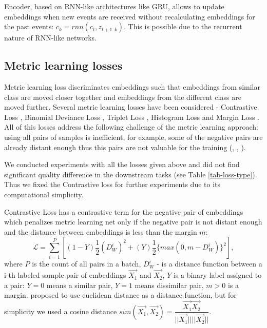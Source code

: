 \documentclass[sigconf]{acmart}
\begin{document}
Encoder, based on RNN-like architectures like GRU\cite{cho2014learning}, allows to update embeddings when new events are received without recalculating embeddings for the past events: $c_k = rnn(c_t, z_{t+1:k})$. This is possible due to the recurrent nature of RNN-like networks.

\subsection{Metric learning losses} \label{sec-ml-loss}

Metric learning loss discriminates embeddings such that embeddings from similar class are moved closer together and embeddings from the different class are moved further. Several metric learning losses have been considered - Contrastive Loss \cite{Hadsell:2006:DRL:1153171.1153654}, Binomial Deviance Loss \cite{Yi:2014:LUE:1407.4979}, Triplet Loss \cite{Hoffer:2015:LUE:1412.6622}, Histogram Loss \cite{histogram-loss} and Margin Loss \cite{wu2017sampling}. All of this losses address the following challenge of the metric learning approach: using all pairs of samples is inefficient, for example, some of the negative pairs are already distant enough thus this pairs are not valuable for the training (\cite{simo2015discriminative}, \cite{wu2017sampling}, \cite{Schroff2015FaceNetAU}).

We conducted experiments with all the losses given above and did not find significant quality difference in the downstream tasks (see Table \ref{tab-loss-type}). Thus we fixed the Contrastive loss for further experiments due to its computational simplicity.

Contrastive Loss has a contrastive term for the negative pair of embeddings which penalizes metric learning net only if the negative pair is not distant enough and the distance between embeddings is less than the margin $m$:  
\begin{equation}
 \mathcal{L} = \sum_{i=1}^P \left[ (1-Y)\dfrac{1}{2}(D_W^i)^2 +(Y)\dfrac{1}{2}\{max(0,m-D_W^i)\}^2 \right],
\end{equation}
where $P$ is the count of all pairs in a batch, $D_W^i$ - is a distance function between a i-th labeled sample pair of embeddings $\vec{X_1}$ and $\vec{X_2}$, 
$Y$ is a binary label assigned to a pair: $Y = 0$ means a similar pair, $Y = 1$ means dissimilar pair, $m > 0$ is a margin.
\cite{Hadsell:2006:DRL:1153171.1153654} proposed to use euclidean distance as a distance function, but for simplicity we used a cosine distance $sim(\vec{X_1},\vec{X_2})=\dfrac{\vec{X_1}\vec{X_2}}{||\vec{X_1}|| ||\vec{X_2}||}$.
\end{document}
